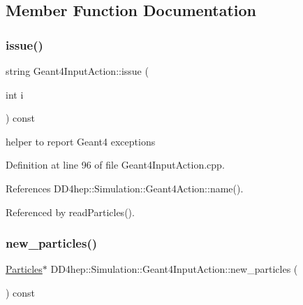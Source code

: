 \subsection{Member Function Documentation}
\hypertarget{class_d_d4hep_1_1_simulation_1_1_geant4_input_action_aba4e9d3b1920ac606dab94d58ac86d12}{}\label{class_d_d4hep_1_1_simulation_1_1_geant4_input_action_aba4e9d3b1920ac606dab94d58ac86d12} 
\subsubsection{\texorpdfstring{issue()}{issue()}}
{\footnotesize\ttfamily string Geant4\+Input\+Action\+::issue (\begin{DoxyParamCaption}\item[{int}]{i }\end{DoxyParamCaption}) const}



helper to report Geant4 exceptions 



Definition at line 96 of file Geant4\+Input\+Action.\+cpp.



References D\+D4hep\+::\+Simulation\+::\+Geant4\+Action\+::name().



Referenced by read\+Particles().

\hypertarget{class_d_d4hep_1_1_simulation_1_1_geant4_input_action_a965cd9f84349ce4189191e263091a859}{}\label{class_d_d4hep_1_1_simulation_1_1_geant4_input_action_a965cd9f84349ce4189191e263091a859} 
\subsubsection{\texorpdfstring{new\+\_\+particles()}{new\_particles()}}
{\footnotesize\ttfamily \hyperlink{class_d_d4hep_1_1_simulation_1_1_geant4_input_action_ae62b1f5e1be390991dd228e7bb7bcc04}{Particles}$\ast$ D\+D4hep\+::\+Simulation\+::\+Geant4\+Input\+Action\+::new\+\_\+particles (\begin{DoxyParamCaption}{ }\end{DoxyParamCaption}) const\hspace{0.3cm}{\ttfamily [inline]}}




